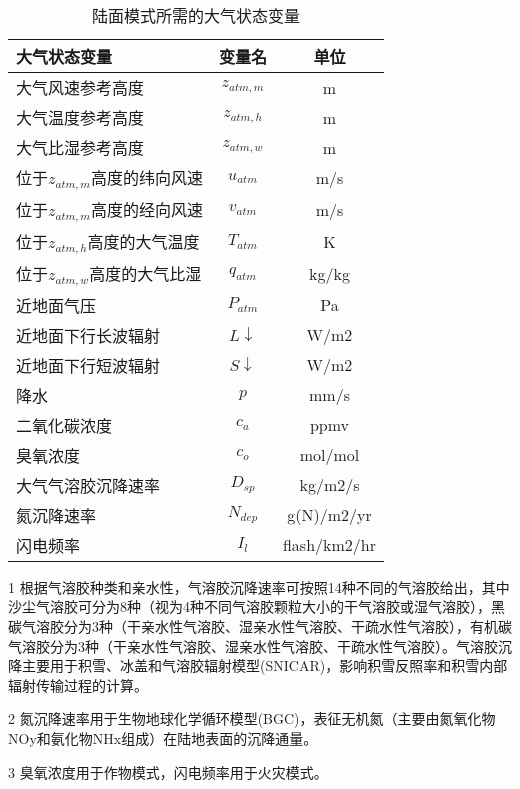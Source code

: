 \begin{table}[]
\centering
\caption{陆面模式所需的大气状态变量}
\label{tab:陆面模式所需的大气状态变量}
\begin{threeparttable}
\begin{tabular}{lcc}
\toprule
大气状态变量               & 变量名           & 单位           \\  \midrule
大气风速参考高度             & $z_{atm,m}$   & m            \\
大气温度参考高度             & $z_{atm,h}$   & m            \\
大气比湿参考高度             & $z_{atm,w}$   & m            \\
位于$z_{atm,m}$高度的纬向风速 & $u_{atm}$     & m/s          \\
位于$z_{atm,m}$高度的经向风速 & $v_{atm}$     & m/s          \\
位于$z_{atm,h}$高度的大气温度 & $T_{atm}$     & K            \\
位于$z_{atm,w}$高度的大气比湿 & $q_{atm}$     & kg/kg        \\
近地面气压                & $P_{atm}$     & Pa           \\
近地面下行长波辐射            & $L\downarrow$ & W/m2         \\
近地面下行短波辐射            & $S\downarrow$ & W/m2         \\
降水                   & $p$           & mm/s         \\
二氧化碳浓度               & $c_a$         & ppmv         \\
臭氧浓度                 & $c_o$         & mol/mol      \\
大气气溶胶沉降速率            & $D_{sp}$      & kg/m2/s      \\
氮沉降速率                & $N_{dep}$     & g(N)/m2/yr   \\
闪电频率                 & $I_l$         & flash/km2/hr \\ \bottomrule
         
\end{tabular}
\begin{tablenotes}
\footnotesize
\item[1] 根据气溶胶种类和亲水性，气溶胶沉降速率可按照14种不同的气溶胶给出，其中沙尘气溶胶可分为8种（视为4种不同气溶胶颗粒大小的干气溶胶或湿气溶胶），黑碳气溶胶分为3种（干亲水性气溶胶、湿亲水性气溶胶、干疏水性气溶胶），有机碳气溶胶分为3种（干亲水性气溶胶、湿亲水性气溶胶、干疏水性气溶胶）。气溶胶沉降主要用于积雪、冰盖和气溶胶辐射模型(SNICAR)，影响积雪反照率和积雪内部辐射传输过程的计算。
\item[2] 氮沉降速率用于生物地球化学循环模型(BGC)，表征无机氮（主要由氮氧化物NOy和氨化物NHx组成）在陆地表面的沉降通量。
\item[3] 臭氧浓度用于作物模式，闪电频率用于火灾模式。
\end{tablenotes}
\end{threeparttable}
\end{table}

